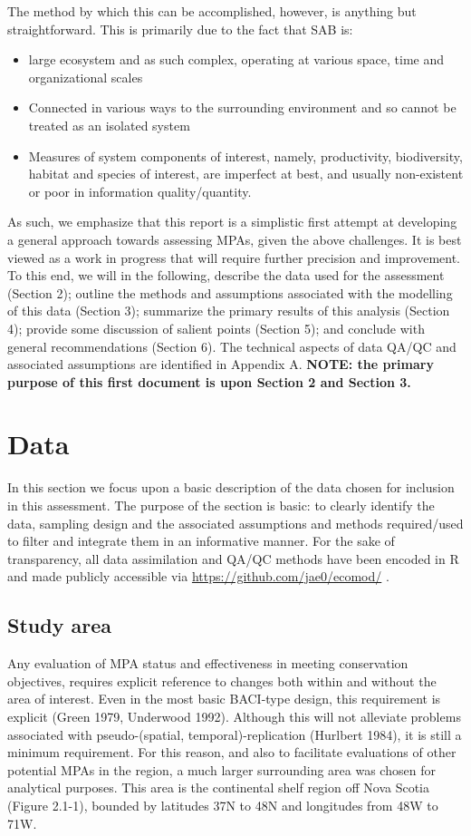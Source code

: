 \documentclass[letterpaper,portrait,11pt]{scrartcl}
\numberwithin{equation}{section}		%
\numberwithin{figure}{section}			%
\numberwithin{table}{section}				%
\begin{document}
The method by which this can be accomplished, however, is anything but straightforward. This is primarily due to the fact that SAB is:

\begin{itemize}
	\item large ecosystem and as such complex, operating at various space, time and organizational scales
	\item Connected in various ways to the surrounding environment and so cannot be treated as an isolated system
	\item Measures of system components of interest, namely, productivity, biodiversity, habitat and species of interest, are imperfect at best, and usually non-existent or poor in information quality/quantity.
\end{itemize}

As such, we emphasize that this report is a simplistic first attempt at developing a general approach towards assessing MPAs, given the above challenges. It is best viewed as a work in progress that will require further precision and improvement.
To this end, we will in the following, describe the data used for the assessment (Section 2); outline the methods and assumptions associated with the modelling of this data (Section 3); summarize the primary results of this analysis (Section 4); provide some discussion of salient points (Section 5); and conclude with general recommendations (Section 6). The technical aspects of data QA/QC and associated assumptions are identified in Appendix A.
\textbf{NOTE: the primary purpose of this first document is upon Section 2 and Section 3. }

\section{Data} 
In this section we focus upon a basic description of the data chosen for inclusion in this assessment. The purpose of the section is basic: to clearly identify the data, sampling design and the associated assumptions and methods required/used to filter and integrate them in an informative manner. For the sake of transparency, all data assimilation and QA/QC methods have been encoded in R \cite{rCran} and made publicly accessible via \url{https://github.com/jae0/ecomod/} . 


\subsection{Study area}
Any evaluation of MPA status and effectiveness in meeting conservation objectives, requires explicit reference to changes both within and without the area of interest. Even in the most basic BACI-type design, this requirement is explicit (Green 1979, Underwood 1992). Although this will not alleviate problems associated with pseudo-(spatial, temporal)-replication (Hurlbert 1984), it is still a minimum requirement. For this reason, and also to facilitate evaluations of other potential MPAs in the region, a much larger surrounding area was chosen for analytical purposes. This area is the continental shelf region off Nova Scotia (Figure 2.1-1), bounded by latitudes 37N to 48N and longitudes from 48W to 71W.  
\end{document}
